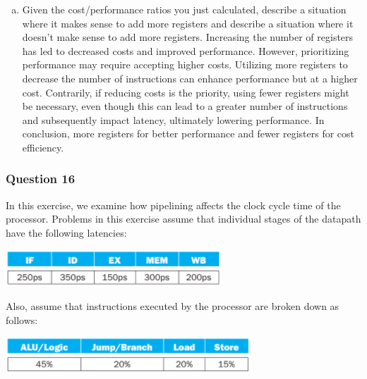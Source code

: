 \documentclass[11pt]{article}
\begin{document}
\begin{enumerate}[(a)]
    \item Given the cost/performance ratios you just calculated, describe a situation where it makes sense to add more registers and describe a situation where it doesn't make sense to add more registers.
    Increasing the number of registers has led to decreased costs and improved performance. However, prioritizing performance may require accepting higher costs. 
    Utilizing more registers to decrease the number of instructions can enhance performance but at a higher cost. 
    Contrarily, if reducing costs is the priority, using fewer registers might be necessary, even though this can lead to a greater number of instructions
    and subsequently impact latency, ultimately lowering performance. In conclusion, more registers for better performance and fewer registers for cost efficiency.
\end{enumerate}

\setcounter{subsubsection}{15}
\subsubsection{Question 16}
In this exercise, we examine how pipelining affects the clock cycle time of the processor. Problems in this exercise assume that individual stages of the datapath have the following latencies:
\begin{center}\includegraphics[scale=0.68]{q16_image1}\\\end{center}
Also, assume that instructions executed by the processor are broken down as follows:
\begin{center}\includegraphics[scale=0.6]{q16_image2}\\\end{center}
\end{document}
